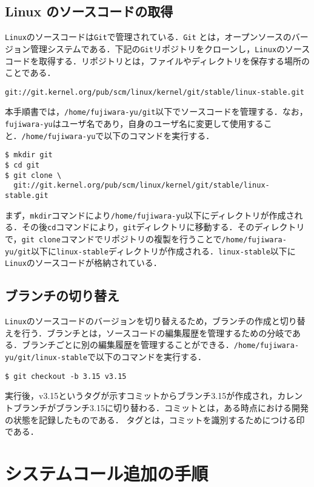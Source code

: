 \documentclass[12pt]{jsarticle}
\begin{document}
\subsection{Linux のソースコードの取得}
\verb|Linux|のソースコードは\verb|Git|で管理されている．\verb|Git| とは，オープンソースのバージョン管理システムである．下記の\verb|Git|リポジトリをクローンし，\verb|Linux|のソースコードを取得する．リポジトリとは，ファイルやディレクトリを保存する場所のことである．
\begin{verbatim}
git://git.kernel.org/pub/scm/linux/kernel/git/stable/linux-stable.git
\end{verbatim}
本手順書では，\verb|/home/fujiwara-yu/git|以下でソースコードを管理する．なお，\verb|fujiwara-yu|はユーザ名であり，自身のユーザ名に変更して使用すること．\verb|/home/fujiwara-yu|で以下のコマンドを実行する．
\begin{verbatim}
$ mkdir git
$ cd git
$ git clone \
  git://git.kernel.org/pub/scm/linux/kernel/git/stable/linux-stable.git
\end{verbatim}
まず，\verb|mkdir|コマンドにより\verb|/home/fujiwara-yu|以下にディレクトリが作成される．その後\verb|cd|コマンドにより，\verb|git|ディレクトリに移動する．そのディレクトリで，\verb|git clone|コマンドでリポジトリの複製を行うことで\verb|/home/fujiwara-yu/git|以下に\verb|linux-stable|ディレクトリが作成される．\verb|linux-stable|以下に\verb|Linux|のソースコードが格納されている．

\subsection{ブランチの切り替え}
\verb|Linux|のソースコードのバージョンを切り替えるため，ブランチの作成と切り替えを行う．ブランチとは，ソースコードの編集履歴を管理するための分岐である．ブランチごとに別の編集履歴を管理することができる．\verb|/home/fujiwara-yu/git/linux-stable|で以下のコマンドを実行する．
\begin{verbatim}
$ git checkout -b 3.15 v3.15
\end{verbatim}
実行後，v3.15というタグが示すコミットからブランチ3.15が作成され，カレントブランチがブランチ3.15に切り替わる．コミットとは，ある時点における開発の状態を記録したものである．
タグとは，コミットを識別するためにつける印である．

\section{システムコール追加の手順}\label{sec:procedure}
\end{document}
